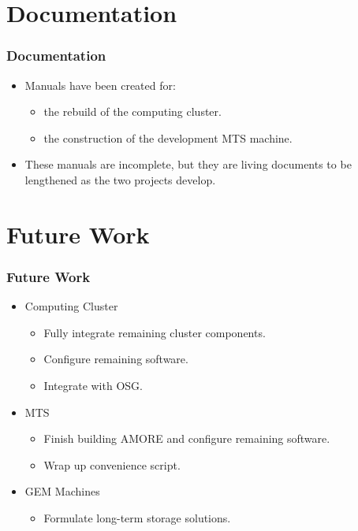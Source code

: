 \documentclass[aspectratio=169]{beamer}
\begin{document}

\section{Documentation}

\begin{frame}

  \frametitle{Documentation}

  \begin{itemize}
    \item Manuals have been created for:
      \begin{itemize}
        \item the rebuild of the computing cluster.
        \item the construction of the development MTS machine.
      \end{itemize}
    \item These manuals are incomplete, but they are living documents to be
      lengthened as the two projects develop.
  \end{itemize}


\end{frame}



\section{Future Work}

\begin{frame}

  \frametitle{Future Work}

  \begin{itemize}
    \item Computing Cluster
      \begin{itemize}
        \item Fully integrate remaining cluster components.
        \item Configure remaining software.
        \item Integrate with OSG.
      \end{itemize}
    \item MTS
      \begin{itemize}
      \item Finish building AMORE and configure remaining software.
      \item Wrap up convenience script.
      \end{itemize}
    \item GEM Machines
      \begin{itemize}
        \item Formulate long-term storage solutions.
      \end{itemize}
  \end{itemize}

\end{frame}
\end{document}
